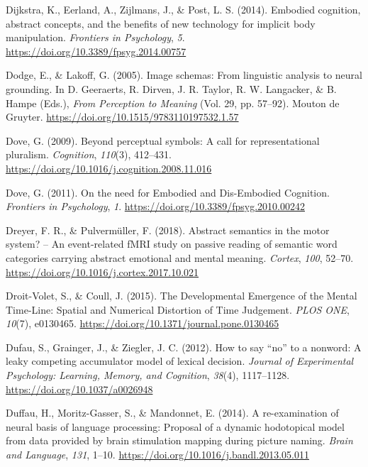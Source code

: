 \documentclass[
  a4paper,12pt,twoside,onecolumn,openright,final,oldfontcommands]{memoir}
\newlength{\cslhangindent}
\newlength{\cslentryspacingunit} %
\newenvironment{CSLReferences}[2] %
 {%
  \setlength{\parindent}{0pt}
  \ifodd #1
  \let\oldpar\par
  \def\par{\hangindent=\cslhangindent\oldpar}
  \fi
  \setlength{\parskip}{#2\cslentryspacingunit}
 }%
 {}
\begin{document}
\begin{CSLReferences}{1}{0}
\leavevmode{}%
Dijkstra, K., Eerland, A., Zijlmans, J., \& Post, L. S. (2014). Embodied cognition, abstract concepts, and the benefits of new technology for implicit body manipulation. \emph{Frontiers in Psychology}, \emph{5}. \url{https://doi.org/10.3389/fpsyg.2014.00757}

\leavevmode{}%
Dodge, E., \& Lakoff, G. (2005). Image schemas: {From} linguistic analysis to neural grounding. In D. Geeraerts, R. Dirven, J. R. Taylor, R. W. Langacker, \& B. Hampe (Eds.), \emph{From {Perception} to {Meaning}} (Vol. 29, pp. 57--92). Mouton de Gruyter. \url{https://doi.org/10.1515/9783110197532.1.57}

\leavevmode{}%
Dove, G. (2009). Beyond perceptual symbols: {A} call for representational pluralism. \emph{Cognition}, \emph{110}(3), 412--431. \url{https://doi.org/10.1016/j.cognition.2008.11.016}

\leavevmode{}%
Dove, G. (2011). On the need for {Embodied} and {Dis}-{Embodied} {Cognition}. \emph{Frontiers in Psychology}, \emph{1}. \url{https://doi.org/10.3389/fpsyg.2010.00242}

\leavevmode{}%
Dreyer, F. R., \& Pulvermüller, F. (2018). Abstract semantics in the motor system? -- {An} event-related {fMRI} study on passive reading of semantic word categories carrying abstract emotional and mental meaning. \emph{Cortex}, \emph{100}, 52--70. \url{https://doi.org/10.1016/j.cortex.2017.10.021}

\leavevmode{}%
Droit-Volet, S., \& Coull, J. (2015). The {Developmental} {Emergence} of the {Mental} {Time}-{Line}: {Spatial} and {Numerical} {Distortion} of {Time} {Judgement}. \emph{PLOS ONE}, \emph{10}(7), e0130465. \url{https://doi.org/10.1371/journal.pone.0130465}

\leavevmode{}%
Dufau, S., Grainger, J., \& Ziegler, J. C. (2012). How to say {``no''} to a nonword: {A} leaky competing accumulator model of lexical decision. \emph{Journal of Experimental Psychology: Learning, Memory, and Cognition}, \emph{38}(4), 1117--1128. \url{https://doi.org/10.1037/a0026948}

\leavevmode{}%
Duffau, H., Moritz-Gasser, S., \& Mandonnet, E. (2014). A re-examination of neural basis of language processing: {Proposal} of a dynamic hodotopical model from data provided by brain stimulation mapping during picture naming. \emph{Brain and Language}, \emph{131}, 1--10. \url{https://doi.org/10.1016/j.bandl.2013.05.011}


\end{CSLReferences}
\end{document}

